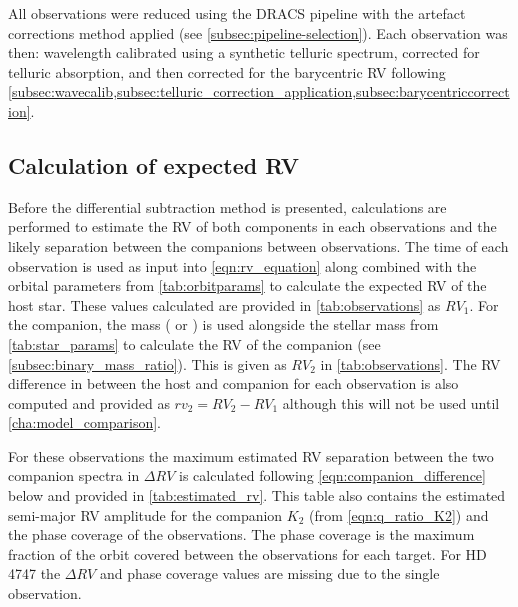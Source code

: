 \begin{landscape}
    
\end{landscape}

All observations were reduced using the {DRACS} pipeline with the artefact corrections method applied (see \cref{subsec:pipeline-selection}).
Each observation was then: wavelength calibrated using a synthetic telluric spectrum, corrected for telluric absorption, and then corrected for the barycentric {RV} following  \cref{subsec:wavecalib,subsec:telluric_correction_application,subsec:barycentriccorrection}.


\subsection{Calculation of expected {RV}}

Before the differential subtraction method is presented, calculations are performed to estimate the {RV} of both components in each observations and the likely separation between the companions between observations.
The time of each observation is used as input into \cref{eqn:rv_equation} along combined with the orbital parameters from \cref{tab:orbitparams} to calculate the expected {RV} of the host star.
These values calculated are provided in \cref{tab:observations} as \({RV}_{1}\).
For the companion, the mass (\Mtwo{} or \Mtwosini{}) is used alongside the stellar mass from \cref{tab:star_params} to calculate the {RV} of the companion (see \cref{subsec:binary_mass_ratio}).
This is given as \({RV}_{2}\) in \cref{tab:observations}.
The {RV} difference in between the host and companion for each observation is also computed and provided as \({rv}_{2} = {RV}_{2}-{RV}_{1}\) although this will not be used until \cref{cha:model_comparison}.

For these observations the maximum estimated {RV} separation between the two companion spectra in \(\Delta {RV}\) is calculated following \cref{eqn:companion_difference} below and provided in \cref{tab:estimated_rv}.
This table also contains the estimated semi-major {RV} amplitude for the companion \(K_2\) (from \cref{eqn:q_ratio_K2}) and the phase coverage of the observations.
The phase coverage is the maximum fraction of the orbit covered between the observations for each target.
For {HD\,4747} the \(\Delta {RV}\) and phase coverage values are missing due to the single observation.


